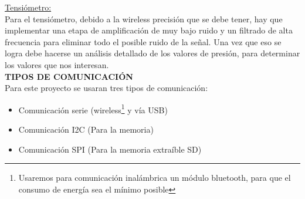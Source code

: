 \documentclass[11pt]{report}
\begin{document}
\noindent \underline{Tensiómetro:} \\
Para el tensiómetro, debido a la wireless precisión que se debe tener, hay que implementar una etapa de amplificación de muy bajo ruido y un filtrado de alta frecuencia para eliminar todo el posible ruido de la señal. Una vez que eso se logra debe hacerse un análisis detallado de los valores de presión, para determinar los valores que nos interesan.\\

\noindent \large \textbf{ TIPOS DE COMUNICACIÓN}\\

Para este proyecto se usaran tres tipos de comunicación: \\

\begin{itemize}
	\item Comunicación serie (wireless\footnote{Usaremos para comunicación inalámbrica un módulo bluetooth, para que el consumo de energía sea el mínimo posible } y vía USB) \\
	\item Comunicación I2C (Para la memoria) \\
	\item  Comunicación SPI (Para la memoria extraíble SD) \\
\end{itemize}
\end{document}
